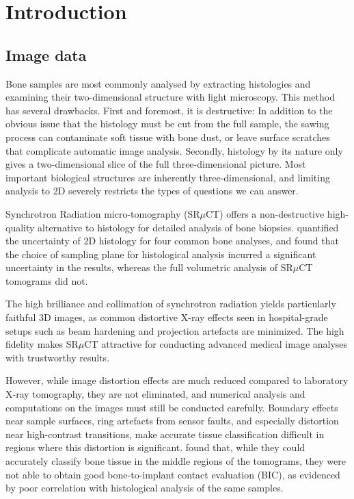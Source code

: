 \section{Introduction}
\label{sec:intro}


\subsection{Image data}

Bone samples are most commonly analysed by extracting histologies and examining their
two-dimensional structure with light microscopy. This method has several drawbacks. First and
foremost, it is destructive: In addition to the obvious issue that the histology must be cut
from the full sample, the sawing process can contaminate soft tissue with bone dust, or leave
surface scratches that complicate automatic image analysis. Secondly, histology by its nature
only gives a two-dimensional slice of the full three-dimensional picture. Most important
biological structures are inherently three-dimensional, and limiting analysis to 2D severely
restricts the types of questions we can answer.

Synchrotron Radiation micro-tomography (SR$\mu$CT) offers a non-destructive high-quality
alternative to histology for detailed analysis of bone biopsies. \cite{torsten2018}
quantified the uncertainty of 2D histology for four common bone analyses, and found that the
choice of sampling plane for histological analysis incurred a significant uncertainty in the
results, whereas the full volumetric analysis of SR$\mu$CT tomograms did not.

The high brilliance and collimation of synchrotron radiation yields particularly
faithful 3D images, as common distortive X-ray effects seen in hospital-grade setups such
as beam hardening and projection artefacts are minimized. The high fidelity makes SR$\mu$CT
attractive for conducting advanced medical image analyses with trustworthy results.

However, while image distortion effects are much reduced compared to laboratory X-ray tomography,
they are not eliminated, and numerical analysis and computations on the images must still be
conducted carefully. Boundary effects near sample surfaces, ring artefacts from sensor faults, and especially
distortion near high-contrast transitions, make accurate tissue classification difficult in
regions where this distortion is significant. \cite{sporring} found that, while
they could accurately classify bone tissue in the middle regions of the tomograms, they were
not able to obtain good bone-to-implant contact evaluation (BIC), as evidenced by poor correlation
with histological analysis of the same samples.

